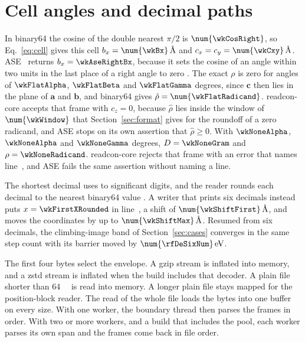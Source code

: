 \section{Cell angles and decimal paths}\label{sec:supp-cell}
In binary64 the cosine of the double nearest \(\pi/2\) is \(\num{\wkCosRight}\), so Eq.~\eqref{eq:cell} gives this cell \(b_x=\num{\wkBx}\,\text{\AA}\) and \(c_x=c_y=\num{\wkCxy}\,\text{\AA}\).
ASE~\wkAseVersion{} returns \(b_x=\wkAseRightBx\), because it sets the cosine of an angle within two units in the last place of a right angle to zero \cite{larsenAtomicSimulationEnvironmenta2017}.
The exact \(\rho\) is zero for angles of \(\wkFlatAlpha\), \(\wkFlatBeta\) and \(\wkFlatGamma\) degrees, since \(\mathbf{c}\) then lies in the plane of \(\mathbf{a}\) and \(\mathbf{b}\), and binary64 gives \(\hat\rho=\num{\wkFlatRadicand}\).
readcon-core accepts that frame with \(c_z=0\), because \(\hat\rho\) lies inside the window of \(\num{\wkWindow}\) that Section~\ref{sec:format} gives for the roundoff of a zero radicand, and ASE stops on its own assertion that \(\hat\rho\ge0\).
With \(\wkNoneAlpha\), \(\wkNoneAlpha\) and \(\wkNoneGamma\) degrees, \(D=\wkNoneGram\) and \(\rho=\wkNoneRadicand\).
readcon-core rejects that frame with an error that names line~\trCellLine, and ASE fails the same assertion without naming a line.

The shortest decimal uses \wkDigitsMin{} to \wkDigitsMax{} significant digits, and the reader rounds each decimal to the nearest binary64 value \cite{lemireNumberParsingGigabytes2021}.
A writer that prints six decimals instead puts \(x=\wkFirstXRounded\) in line~\wkLineFirstRow, a shift of \(\num{\wkShiftFirst}\,\text{\AA}\), and moves the \wkCoordinates{} coordinates by up to \(\num{\wkShiftMax}\,\text{\AA}\).
Resumed from six decimals, the climbing-image band of Section~\ref{sec:cases} converges in the same step count with its barrier moved by \(\num{\rfDeSixNum}\,\mathrm{eV}\).

The first four bytes select the envelope.
A gzip stream is inflated into memory, and a zstd stream is inflated when the build includes that decoder.
A plain file shorter than \SI{64}{\kibi\byte} is read into memory.
A longer plain file stays mapped for the position-block reader.
The read of the whole file loads the bytes into one buffer on every size.
With one worker, the boundary thread then parses the frames in order.
With two or more workers, and a build that includes the pool, each worker parses its own span and the frames come back in file order.

